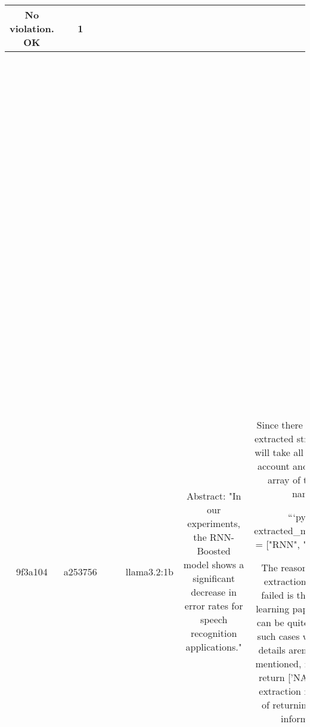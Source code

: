 \begin{table}[h!]
\begin{tabular}{|c|c|c|c|c|c|c|c|c|c|}
No violation.
OK & 1\\
\hline
9f3a104 & a253756 &  &  & llama3.2:1b & Abstract: "In our experiments, the RNN-Boosted model shows a significant decrease in error rates for speech recognition applications." & Since there are multiple extracted string values, I will take all of them into account and provide an array of the model names.

```python
extracted_model_names = ["RNN", "Boosted"]
```

The reason why some extraction may have failed is that machine learning paper abstracts can be quite lengthy. In such cases where model details aren't explicitly mentioned, it's better to return ['NA'] when the extraction fails instead of returning incorrect information. & err & The chatbot's output provided an array of the model names `["RNN", "Boosted"]` as instructed. According to the description, the response should either be an array containing model names in the format `["model_name"]` if model names were found or `["NA"]` if no model names were found or it wasn't sure. The explanation suggests that multiple extracted values were considered, but ultimately, it resulted in valid model names presented in the correct format. 

I can critique that the output includes content outside of a simple array of model names or `["NA"]`, which may be a non-compliance regarding simplicity. Yet, it still provides the expected array of model names properly formatted.

Taking into account the guidelines, this output does comply chiefly with the formatting rule. However, according to strict interpretation of description, any additional commentary when listing model names isn't mentioned in format rule - hence it might raise some concern whether the commentary part should exist or not.

ERR & 1\\
\hline
b7d5136 & a253756 &  &  & gpt-4o-mini & Abstract: "A sophisticated reinforcement learning model called Q-Learn++ is analyzed for its effectiveness in dynamic environments." & ["Q-Learn++"] & ok & The chatbot's output is in the correct format specified in the description. The output is an array with a model name inside it, which matches the required structure ["model_name"]. The description also states that if no model names are found or if there is uncertainty, the output should be ["NA"]. However, since we don't have the input to verify correctness, we are only checking compliance with the required format. As per the compliance checks not requiring input, the output complies with the description.


\end{tabular}
\end{table}
